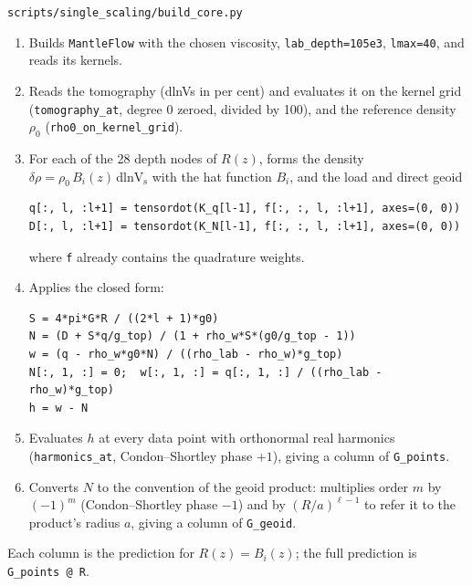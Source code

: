 \begin{incode}{\texttt{scripts/single\_scaling/build\_core.py}}
\begin{enumerate}[nosep]
\item Builds \texttt{MantleFlow} with the chosen viscosity, \texttt{lab\_depth=105e3}, \texttt{lmax=40}, and reads its kernels.
\item Reads the tomography (dlnVs in per cent) and evaluates it on the kernel grid (\texttt{tomography\_at}, degree 0 zeroed, divided by 100), and the reference density $\rho_0$ (\texttt{rho0\_on\_kernel\_grid}).
\item For each of the 28 depth nodes of $R(z)$, forms the density $\delta\rho = \rho_0\,B_i(z)\,\mathrm{dlnV_s}$ with the hat function $B_i$, and the load and direct geoid
\begin{lstlisting}
q[:, l, :l+1] = tensordot(K_q[l-1], f[:, :, l, :l+1], axes=(0, 0))
D[:, l, :l+1] = tensordot(K_N[l-1], f[:, :, l, :l+1], axes=(0, 0))
\end{lstlisting}
where \texttt{f} already contains the quadrature weights.
\item Applies the closed form:
\begin{lstlisting}
S = 4*pi*G*R / ((2*l + 1)*g0)
N = (D + S*q/g_top) / (1 + rho_w*S*(g0/g_top - 1))
w = (q - rho_w*g0*N) / ((rho_lab - rho_w)*g_top)
N[:, 1, :] = 0;  w[:, 1, :] = q[:, 1, :] / ((rho_lab - rho_w)*g_top)
h = w - N
\end{lstlisting}
\item Evaluates $h$ at every data point with orthonormal real harmonics (\texttt{harmonics\_at}, Condon--Shortley phase $+1$), giving a column of \texttt{G\_points}.
\item Converts $N$ to the convention of the geoid product: multiplies order $m$ by $(-1)^m$ (Condon--Shortley phase $-1$) and by $(R/a)^{\ell-1}$ to refer it to the product's radius $a$, giving a column of \texttt{G\_geoid}.
\end{enumerate}
Each column is the prediction for $R(z) = B_i(z)$; the full prediction is \texttt{G\_points @ R}.
\end{incode}
